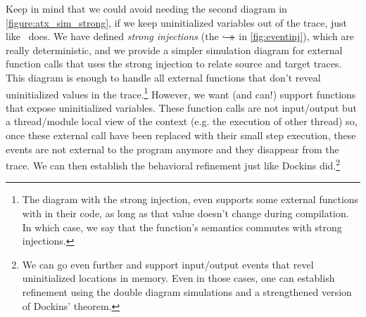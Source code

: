 Keep in mind that we could avoid needing the second diagram in \cref{figure:atx_sim_strong}, if we keep uninitialized variables out of the trace, just like \compcert\ does. We have defined \emph{strong injections} (the $\overset{}{\hookrightarrow\mathrel{\mspace{-15mu}}\rightarrow}$ in \cref{fig:eventinj}), which are really deterministic, and we provide a simpler simulation diagram for external function calls that uses the strong injection to relate source and target traces. This diagram is enough to handle all external functions that don't reveal uninitialized values in the trace.\footnote{The diagram with the strong injection, even supports some external functions with  in their code, as long as that value doesn't change during compilation. In which case, we say that the function's semantics commutes with strong injections. } However, we want (and can!) support functions that expose uninitialized variables. These function calls are not input/output but a thread/module local view of the context (e.g. the execution of other thread) so, once these external call have been replaced with their small step execution, these events are not external to the program anymore and they disappear from the trace.  We can then establish the behavioral refinement just like Dockins did.\footnote{We can go even further and support input/output events that revel uninitialized locations in memory. Even in those cases, one can establish refinement using the double diagram simulations and a strengthened version of Dockins' theorem.}


